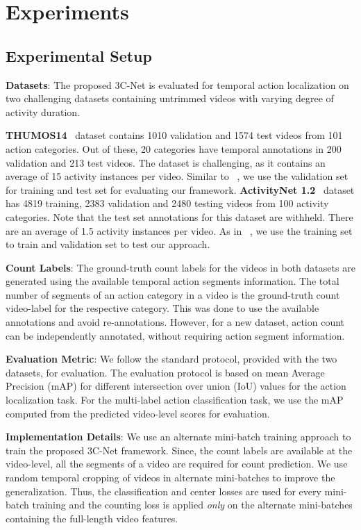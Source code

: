 \documentclass[10pt,twocolumn,letterpaper]{article}
\begin{document}
\section{Experiments \label{sec_exp_setup_results}}

\subsection{Experimental Setup\label{sec_exp_setup}}
\noindent\textbf{Datasets}: The proposed 3C-Net is evaluated for temporal action localization on two challenging datasets containing untrimmed videos with varying degree of activity duration. 

\noindent\textbf{THUMOS14}~\cite{thumos14} dataset contains 1010 validation and 1574 test videos from 101 action categories. Out of these, 20 categories have temporal annotations in 200 validation and 213 test videos. The dataset is challenging, as it contains an average of 15 activity instances per video. Similar to ~\cite{stpn,wtalc}, we use the validation set for training and test set for evaluating our framework. 
\noindent\textbf{ActivityNet 1.2}~\cite{activitynet} dataset has 4819 training, 2383 validation and 2480 testing videos from 100 activity categories. Note that the test set annotations for this dataset are withheld. There are an average of 1.5 activity instances per video. As in ~\cite{autoloc,wtalc}, we use the training set to train and validation set to test our approach. 

\noindent\textbf{Count Labels}: The ground-truth count labels for the videos in both datasets are generated using the available temporal action segments information. The total number of segments of an action category in a video is the ground-truth count video-label for the respective category. This was done to use the available annotations and avoid re-annotations. However, for a new dataset, action count can be independently annotated, without requiring action segment information.

\noindent\textbf{Evaluation Metric}: We follow the standard protocol, provided with the two datasets, for evaluation. The evaluation protocol is based on mean Average Precision (mAP) for different intersection over union (IoU) values for the action localization task. For the multi-label action classification task, we use the mAP computed from the predicted video-level scores for evaluation.

\noindent\textbf{Implementation Details}:
We use an alternate mini-batch training approach to train the proposed 3C-Net framework. Since, the count labels are available at the video-level, all the segments of a video are required for count prediction.  We use random temporal cropping of videos in alternate mini-batches to improve the generalization. Thus, the classification and center losses are used for every mini-batch training and the counting loss is applied \emph{only} on the alternate mini-batches containing the full-length video features.
\end{document}
